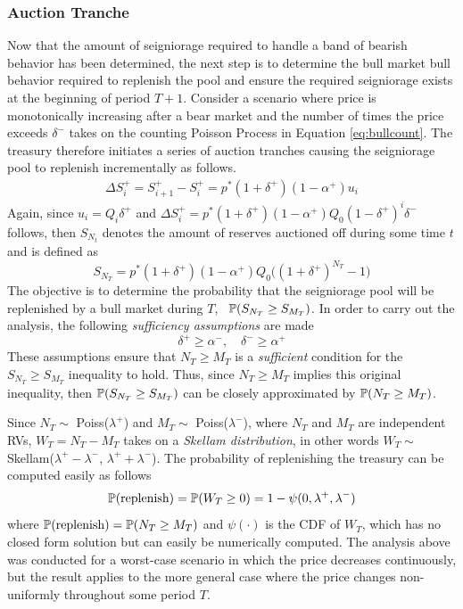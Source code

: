 \subsubsection{Auction Tranche}
Now that the amount of seigniorage required to handle a band of bearish behavior has been determined, the next step is to determine the bull market bull behavior required to replenish the pool and ensure the required seigniorage exists at the beginning of period $T+1$. Consider a scenario where price is monotonically increasing after a bear market and the number of times the price exceeds $\delta^-$ takes on the counting Poisson Process in Equation \ref{eq:bullcount}. The treasury therefore initiates a series of auction tranches causing the seigniorage pool to replenish incrementally as follows.
%
\begin{align*}
\Delta S_i^+ = S_{i+1}^+ - S_i^+ = p^*(1+\delta^+)(1-\alpha^+)u_i 
\end{align*}
%
Again, since $u_i = Q_i\delta^+$ and $\Delta S_i^+ = p^*(1+\delta^+)(1-\alpha^+)Q_0(1-\delta^+)^i\delta^-$ follows, then $S_{N_t}$ denotes the amount of reserves auctioned off during some time $t$ and is defined as
%
\begin{equation} \label{eq:Sreplenish}
S_{N_T} = p^*(1+\delta^+)(1-\alpha^+)Q_0\big((1+\delta^+)^{N_T} - 1 \big)
\end{equation}
%
The objective is to determine the probability that the seigniorage pool will be replenished by a bull market during $T$, \ie\ $\mathbb{P}(S_{N_T} \geq S_{M_T})$. In order to carry out the analysis, the following \textit{sufficiency assumptions} are made
%
\begin{equation*} \label{eq:sufficientassumptions}
\delta^+ \geq \alpha^-, \quad \delta^- \geq \alpha^+
\end{equation*}
%
These assumptions ensure that $N_T \geq M_T$ is a \textit{sufficient} condition for the $S_{N_T} \geq S_{M_T}$ inequality to hold. Thus, since $N_T \geq M_T$ implies this original inequality, then $\mathbb{P}(S_{N_T} \geq S_{M_T})$ can be closely approximated by $\mathbb{P}(N_T \geq M_T)$.

Since $N_T \sim$ Poiss($\lambda^+$) and $M_T \sim$ Poiss($\lambda^-$), where $N_T$ and $M_T$ are independent RVs, $W_T = N_T - M_T$ takes on a \textit{Skellam distribution}, in other words $W_T \sim$ Skellam($\lambda^+ - \lambda^-$, $\lambda^+ + \lambda^-$). The probability of replenishing the treasury can be computed easily as follows
%
\begin{equation} \label{eq:bullbounds}
\mathbb{P}(\text{replenish}) = \mathbb{P}(W_T \geq 0) = 1 - \psi(0, \lambda^+, \lambda^-)
\end{equation}
%
where $\mathbb{P}(\text{replenish}) = \mathbb{P}(N_T \geq M_T)$ and $\psi(\cdot)$ is the CDF of $W_T$, which has no closed form solution but can easily be numerically computed. The analysis above was conducted for a worst-case  scenario in which the price decreases continuously, but the result applies to the more general case where the price changes non-uniformly throughout some period $T$. 

